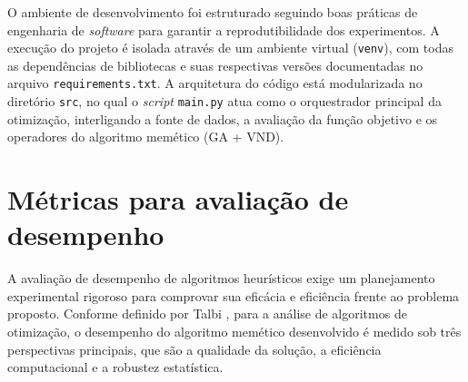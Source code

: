 O ambiente de desenvolvimento foi estruturado seguindo boas práticas de engenharia de \textit{software} para garantir a reprodutibilidade dos experimentos. A execução do projeto é isolada através de um ambiente virtual (\texttt{venv}), com todas as dependências de bibliotecas e suas respectivas versões documentadas no arquivo \texttt{requirements.txt}. A arquitetura do código está modularizada no diretório \texttt{src}, no qual o \textit{script} \texttt{main.py} atua como o orquestrador principal da otimização, interligando a fonte de dados, a avaliação da função objetivo e os operadores do algoritmo memético (GA + VND).




\section{Métricas para avaliação de desempenho}
\label{sec:metricas}

A avaliação de desempenho de algoritmos heurísticos exige um planejamento experimental rigoroso para comprovar sua eficácia e eficiência frente ao problema proposto. Conforme definido por Talbi \cite{talbi2009metaheuristics}, para a análise de algoritmos de otimização, o desempenho do algoritmo memético desenvolvido é medido sob três perspectivas principais, que são a qualidade da solução, a eficiência computacional e a robustez estatística.

